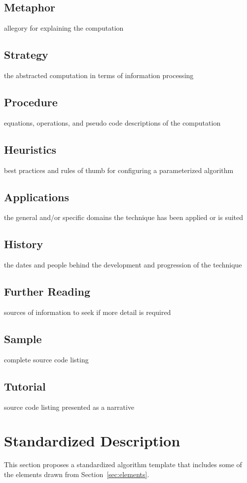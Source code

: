 \documentclass[a4paper, 11pt]{article}
\begin{document}
\subsection{Metaphor}
allegory for explaining the computation

\subsection{Strategy}
the abstracted computation in terms of information processing

\subsection{Procedure}
equations, operations, and pseudo code descriptions of the computation

\subsection{Heuristics}
best practices and rules of thumb for configuring a parameterized algorithm

\subsection{Applications}
the general and/or specific domains the technique has been applied or is suited

\subsection{History}
the dates and people behind the development and progression of the technique

\subsection{Further Reading}
sources of information to seek if more detail is required

\subsection{Sample}
complete source code listing

\subsection{Tutorial}
source code listing presented as a narrative


\section{Standardized Description} 
\label{sec:template}
This section proposes a standardized algorithm template that includes some of the elements drawn from Section~\ref{sec:elements}. 
\end{document}
